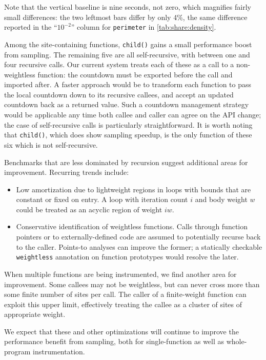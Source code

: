 Note that the vertical baseline is nine seconds, not zero, which
magnifies fairly small differences: the two leftmost bars differ by
only 4\%, the same difference reported in the ``$10^{-2}$'' column for
\texttt{perimeter} in \autoref{tab:share:density}.

Among the site-containing functions, \texttt{child()} gains a small
performance boost from sampling.  The remaining five are all
self-recursive, with between one and four recursive calls.  Our
current system treats each of these as a call to a non-weightless
function: the countdown must be exported before the call and imported
after.  A faster approach would be to transform each function to pass
the local countdown down to its recursive callees, and accept an
updated countdown back as a returned value.  Such a countdown
management strategy would be applicable any time both callee and
caller can agree on the API change; the case of self-recursive calls
is particularly straightforward.  It is worth noting that
\texttt{child()}, which does show sampling speedup, is the only
function of these six which is not self-recursive.

Benchmarks that are less dominated by recursion suggest additional
areas for improvement.  Recurring trends include:

\begin{itemize}
  
\item Low amortization due to lightweight regions in loops with bounds that
  are constant or fixed on entry.  A loop with iteration count $i$ and
  body weight $w$ could be treated as an acyclic region of weight
  $iw$.
  
\item Conservative identification of weightless functions.  Calls
  through function pointers or to externally-defined code are assumed
  to potentially recurse back to the caller.  Points-to analyses can
  improve the former; a statically checkable \texttt{weightless}
  annotation on function prototypes would resolve the later.
\end{itemize}

When multiple functions are being instrumented, we find another area
for improvement.  Some callees may not be weightless, but can never
cross more than some finite number of sites per call.  The caller of a
finite-weight function can exploit this upper limit, effectively
treating the callee as a cluster of sites of appropriate weight.

We expect that these and other optimizations will continue to improve
the performance benefit from sampling, both for single-function as
well as whole-program instrumentation.

